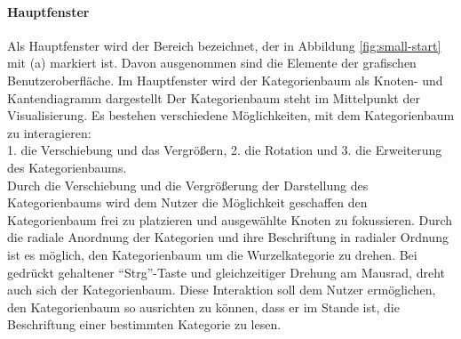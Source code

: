 \paragraph{Hauptfenster}
Als Hauptfenster wird der Bereich bezeichnet, der in Abbildung \ref{fig:small-start} mit (a) markiert ist.
Davon ausgenommen sind die Elemente der grafischen Benutzeroberfläche.
Im Hauptfenster wird der Kategorienbaum als Knoten- und Kantendiagramm dargestellt
Der Kategorienbaum steht im Mittelpunkt der Visualisierung.
Es bestehen verschiedene Möglichkeiten, mit dem Kategorienbaum zu interagieren:\\ 1. die Verschiebung und das Vergrößern, 2. die Rotation und 3. die Erweiterung des Kategorienbaums.\\
Durch die Verschiebung und die Vergrößerung der Darstellung des Kategorienbaums wird dem Nutzer die Möglichkeit geschaffen den Kategorienbaum frei zu platzieren und ausgewählte Knoten zu fokussieren.
Durch die radiale Anordnung der Kategorien und ihre Beschriftung in radialer Ordnung ist es möglich, den Kategorienbaum um die Wurzelkategorie zu drehen.
Bei gedrückt gehaltener "`Strg"'-Taste und gleichzeitiger Drehung am Mausrad, dreht auch sich der Kategorienbaum.
Diese Interaktion soll dem Nutzer ermöglichen, den Kategorienbaum so ausrichten zu können, dass er im Stande ist, die Beschriftung einer bestimmten Kategorie zu lesen.
